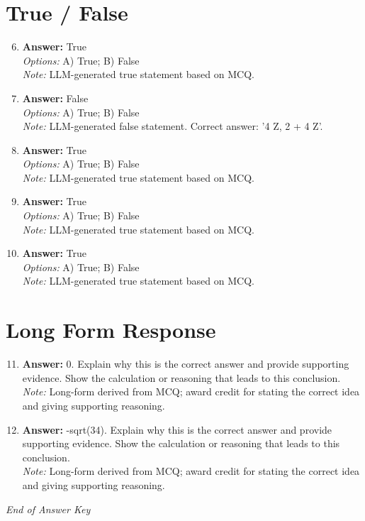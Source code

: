 \documentclass[12pt]{article}
\begin{document}
\section*{True / False}
\begin{enumerate}[label=\arabic*.]
\setcounter{enumi}{5}
\item \textbf{Answer:} True
\\ \textit{Options:} A) True; B) False
\\ \textit{Note:} LLM-generated true statement based on MCQ.
\item \textbf{Answer:} False
\\ \textit{Options:} A) True; B) False
\\ \textit{Note:} LLM-generated false statement. Correct answer: '4 Z, 2 + 4 Z'.
\item \textbf{Answer:} True
\\ \textit{Options:} A) True; B) False
\\ \textit{Note:} LLM-generated true statement based on MCQ.
\item \textbf{Answer:} True
\\ \textit{Options:} A) True; B) False
\\ \textit{Note:} LLM-generated true statement based on MCQ.
\item \textbf{Answer:} True
\\ \textit{Options:} A) True; B) False
\\ \textit{Note:} LLM-generated true statement based on MCQ.
\end{enumerate}

\section*{Long Form Response}
\begin{enumerate}[label=\arabic*.]
\setcounter{enumi}{10}
\item \textbf{Answer:} 0. Explain why this is the correct answer and provide supporting evidence. Show the calculation or reasoning that leads to this conclusion.
\\ \textit{Note:} Long-form derived from MCQ; award credit for stating the correct idea and giving supporting reasoning.
\item \textbf{Answer:} -sqrt(34). Explain why this is the correct answer and provide supporting evidence. Show the calculation or reasoning that leads to this conclusion.
\\ \textit{Note:} Long-form derived from MCQ; award credit for stating the correct idea and giving supporting reasoning.
\end{enumerate}

\vfill
\noindent\textit{End of Answer Key}
\end{document}
